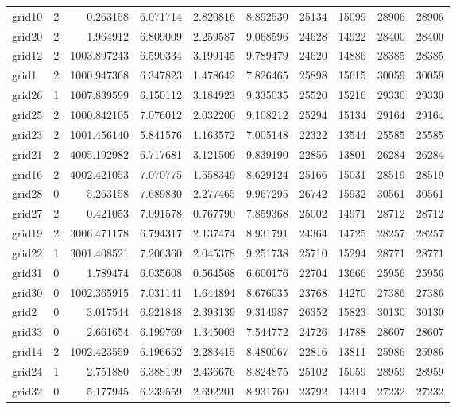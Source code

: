 \begin{longtable}{|l|r|r|r|r|r|r|r|r|r|}
grid10 & 2 & 0.263158 & 6.071714 & 2.820816 & 8.892530 & 25134 & 15099 & 28906 & 28906 \\
grid20 & 2 & 1.964912 & 6.809009 & 2.259587 & 9.068596 & 24628 & 14922 & 28400 & 28400 \\
grid12 & 2 & 1003.897243 & 6.590334 & 3.199145 & 9.789479 & 24620 & 14886 & 28385 & 28385 \\
grid1 & 2 & 1000.947368 & 6.347823 & 1.478642 & 7.826465 & 25898 & 15615 & 30059 & 30059 \\
grid26 & 1 & 1007.839599 & 6.150112 & 3.184923 & 9.335035 & 25520 & 15216 & 29330 & 29330 \\
grid25 & 2 & 1000.842105 & 7.076012 & 2.032200 & 9.108212 & 25294 & 15134 & 29164 & 29164 \\
grid23 & 2 & 1001.456140 & 5.841576 & 1.163572 & 7.005148 & 22322 & 13544 & 25585 & 25585 \\
grid21 & 2 & 4005.192982 & 6.717681 & 3.121509 & 9.839190 & 22856 & 13801 & 26284 & 26284 \\
grid16 & 2 & 4002.421053 & 7.070775 & 1.558349 & 8.629124 & 25166 & 15031 & 28519 & 28519 \\
grid28 & 0 & 5.263158 & 7.689830 & 2.277465 & 9.967295 & 26742 & 15932 & 30561 & 30561 \\
grid27 & 2 & 0.421053 & 7.091578 & 0.767790 & 7.859368 & 25002 & 14971 & 28712 & 28712 \\
grid19 & 2 & 3006.471178 & 6.794317 & 2.137474 & 8.931791 & 24364 & 14725 & 28257 & 28257 \\
grid22 & 1 & 3001.408521 & 7.206360 & 2.045378 & 9.251738 & 25710 & 15294 & 28771 & 28771 \\
grid31 & 0 & 1.789474 & 6.035608 & 0.564568 & 6.600176 & 22704 & 13666 & 25956 & 25956 \\
grid30 & 0 & 1002.365915 & 7.031141 & 1.644894 & 8.676035 & 23768 & 14270 & 27386 & 27386 \\
grid2 & 0 & 3.017544 & 6.921848 & 2.393139 & 9.314987 & 26352 & 15823 & 30130 & 30130 \\
grid33 & 0 & 2.661654 & 6.199769 & 1.345003 & 7.544772 & 24726 & 14788 & 28607 & 28607 \\
grid14 & 2 & 1002.423559 & 6.196652 & 2.283415 & 8.480067 & 22816 & 13811 & 25986 & 25986 \\
grid24 & 1 & 2.751880 & 6.388199 & 2.436676 & 8.824875 & 25102 & 15059 & 28959 & 28959 \\
grid32 & 0 & 5.177945 & 6.239559 & 2.692201 & 8.931760 & 23792 & 14314 & 27232 & 27232 \\

\end{longtable}
